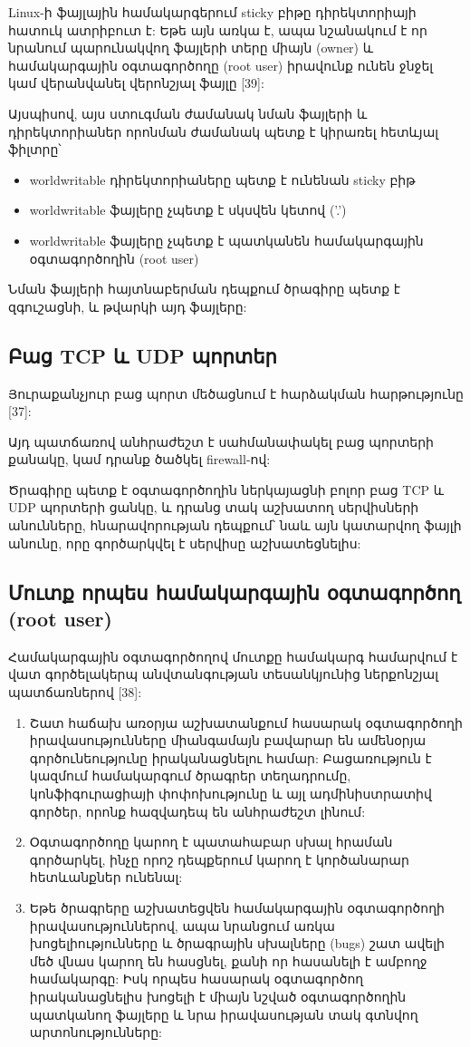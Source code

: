 \documentclass[a4paper,12pt]{article}
\begin{document}
\begin{sloppypar}
Linux-ի ֆայլային համակարգերում sticky բիթը դիրեկտորիայի հատուկ ատրիբուտ է:
Եթե այն առկա է, ապա նշանակում է որ նրանում պարունակվող ֆայլերի տերը միայն (owner)
և համակարգային օգտագործողը (root user) իրավունք ունեն ջնջել կամ վերանվանել
վերոնշյալ ֆայլը [39]:

Այսպիսով, այս ստուգման ժամանակ նման ֆայլերի և դիրեկտորիաներ որոնման ժամանակ
պետք է կիրառել հետևյալ ֆիլտրը՝

\begin{itemize}
\item worldwritable դիրեկտորիաները պետք է ունենան sticky բիթ
\item worldwritable ֆայլերը չպետք է սկսվեն կետով ('.')
\item worldwritable ֆայլերը չպետք է պատկանեն համակարգային օգտագործողին
	(root user)
\end{itemize}

Նման ֆայլերի հայտնաբերման դեպքում ծրագիրը պետք է զգուշացնի,
և թվարկի այդ ֆայլերը:


\subsection{Բաց TCP և UDP պորտեր}


Յուրաքանչյուր բաց պորտ մեծացնում է հարձակման հարթությունը [37]:

Այդ պատճառով անհրաժեշտ է սահմանափակել բաց պորտերի քանակը,
կամ դրանք ծածկել firewall-ով:

Ծրագիրը պետք է օգտագործողին ներկայացնի բոլոր բաց 
TCP և UDP պորտերի ցանկը, և դրանց տակ աշխատող սերվիսների
անունները, հնարավորության դեպքում՝ նաև այն կատարվող
ֆայլի անունը, որը գործարկվել է սերվիսը աշխատեցնելիս:


\subsection{Մուտք որպես համակարգային օգտագործող (root user)}


Համակարգային օգտագործողով մուտքը համակարգ համարվում է վատ
գործելակերպ անվտանգության տեսանկյունից ներքոնշյալ պատճառներով [38]:

\begin{enumerate}
\item Շատ հաճախ առօրյա աշխատանքում հասարակ օգտագործողի իրավասությունները
	միանգամայն բավարար են ամենօրյա գործունեությունը իրականացնելու համար:
	Բացառություն է կազմում համակարգում ծրագրեր տեղադրումը, կոնֆիգուրացիայի
	փոփոխությունը և այլ ադմինիստրատիվ գործեր, որոնք հազվադեպ են անհրաժեշտ
	լինում:
\item Օգտագործողը կարող է պատահաբար սխալ հրաման գործարկել, ինչը որոշ
	դեպքերում կարող է կործանարար հետևանքներ ունենալ:
\item Եթե ծրագրերը աշխատեցվեն համակարգային օգտագործողի իրավասություններով,
	ապա նրանցում առկա խոցելիությունները և ծրագրային սխալները (bugs) շատ
	ավելի մեծ վնաս կարող են հասցնել, քանի որ հասանելի է ամբողջ համակարգը:
	Իսկ որպես հասարակ օգտագործող
	իրականացնելիս խոցելի է միայն նշված օգտագործողին պատկանող ֆայլերը և
	նրա իրավասության տակ գտնվող արտոնությունները:
\end{enumerate}



\end{sloppypar}
\end{document}
